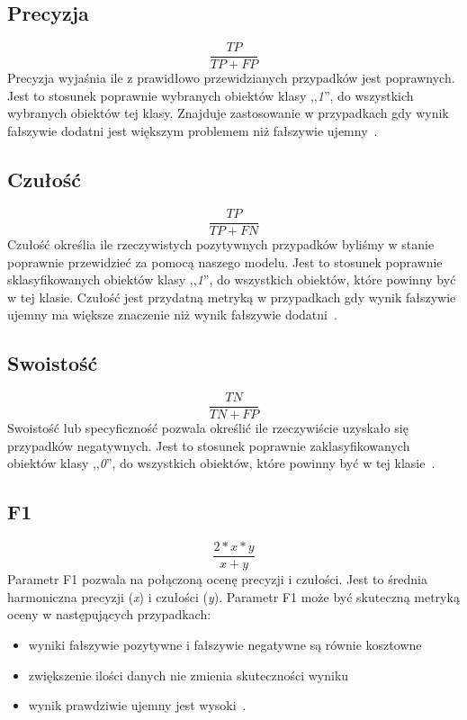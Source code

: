 \subsection{Precyzja}
\begin{equation}\label{math:prec}
    \frac{TP}{TP + FP}
\end{equation}
Precyzja wyjaśnia ile z prawidłowo przewidzianych przypadków jest poprawnych. Jest to stosunek poprawnie wybranych obiektów klasy ,,\textit{1}'', do wszystkich wybranych obiektów tej klasy. Znajduje zastosowanie w przypadkach gdy wynik fałszywie dodatni jest większym problemem niż fałszywie ujemny~\cite{Agrawal2024, Blyszcz2022, Kulkarni2020}.

\subsection{Czułość}
\begin{equation}\label{math:rec}
    \frac{TP}{TP + FN}
\end{equation}
Czułość określia ile rzeczywistych pozytywnych przypadków byliśmy w stanie poprawnie przewidzieć za pomocą naszego modelu. Jest to stosunek poprawnie sklasyfikowanych obiektów klasy ,,\textit{1}'', do wszystkich obiektów, które powinny być w tej klasie. Czułość jest przydatną metryką w przypadkach gdy wynik fałszywie ujemny ma większe znaczenie niż wynik fałszywie dodatni~\cite{Agrawal2024, Blyszcz2022, Kulkarni2020}.

\subsection{Swoistość}
\begin{equation}\label{math:swo}
    \frac{TN}{TN + FP}
\end{equation}
Swoistość lub specyficzność pozwala określić ile rzeczywiście uzyskało się przypadków negatywnych. Jest to stosunek poprawnie zaklasyfikowanych obiektów klasy ,,\textit{0}'', do wszystkich obiektów, które powinny być w tej klasie~\cite{Agrawal2024}.

\subsection{F1}
\begin{equation}\label{math:f1}
   \frac{2*x*y}{x + y}
\end{equation}
Parametr F1 pozwala na połączoną ocenę precyzji i czułości. Jest to średnia harmoniczna precyzji (\textit{x}) i czułości (\textit{y}). Parametr F1 może być skuteczną metryką oceny w następujących przypadkach:
\begin{itemize}
    \item wyniki fałszywie pozytywne i fałszywie negatywne są równie kosztowne
    \item zwiększenie ilości danych nie zmienia skuteczności wyniku
    \item wynik prawdziwie ujemny jest wysoki~\cite{Agrawal2024}.
\end{itemize}


